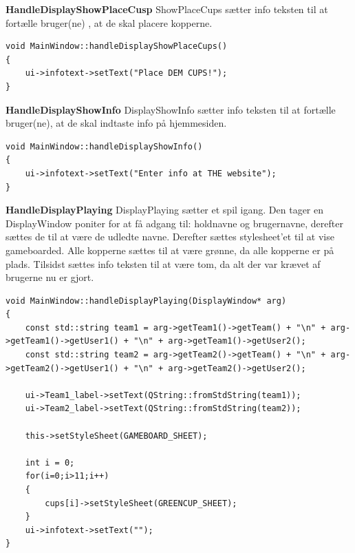 \documentclass[Softwaredesign/Softwaredesign_main.tex]{subfiles}
\begin{document}
\textbf{HandleDisplayShowPlaceCusp}
ShowPlaceCups sætter info teksten til at fortælle bruger(ne) , at de skal placere kopperne.
\begin{verbatim}
void MainWindow::handleDisplayShowPlaceCups()
{
    ui->infotext->setText("Place DEM CUPS!");
}
\end{verbatim}


\textbf{HandleDisplayShowInfo}
DisplayShowInfo sætter info teksten til at fortælle bruger(ne), at de skal indtaste info på hjemmesiden.
\begin{verbatim}
void MainWindow::handleDisplayShowInfo()
{
    ui->infotext->setText("Enter info at THE website");
}
\end{verbatim}


\textbf{HandleDisplayPlaying}
DisplayPlaying sætter et spil igang. Den tager en DisplayWindow poniter for at få adgang til: holdnavne og brugernavne, derefter sættes de til at være de udledte navne. Derefter sættes stylesheet'et til at vise gameboarded.  Alle kopperne sættes til at være grønne, da alle kopperne er på plads.  Tilsidst sættes info teksten til at være tom,  da alt der var krævet af brugerne nu er gjort.  
\begin{verbatim}
void MainWindow::handleDisplayPlaying(DisplayWindow* arg)
{
    const std::string team1 = arg->getTeam1()->getTeam() + "\n" + arg->getTeam1()->getUser1() + "\n" + arg->getTeam1()->getUser2();
    const std::string team2 = arg->getTeam2()->getTeam() + "\n" + arg->getTeam2()->getUser1() + "\n" + arg->getTeam2()->getUser2();

    ui->Team1_label->setText(QString::fromStdString(team1));
    ui->Team2_label->setText(QString::fromStdString(team2));

    this->setStyleSheet(GAMEBOARD_SHEET);

    int i = 0;
    for(i=0;i>11;i++)
    {
        cups[i]->setStyleSheet(GREENCUP_SHEET);
    }
    ui->infotext->setText("");
}
\end{verbatim}
\end{document}

